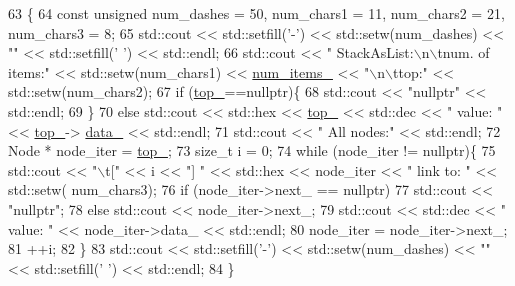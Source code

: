 \begin{DoxyCode}
63                                    \{
64         \textcolor{keyword}{const} \textcolor{keywordtype}{unsigned} num\_dashes = 50, num\_chars1 = 11, num\_chars2 = 21, num\_chars3 = 8;
65         std::cout << std::setfill(\textcolor{charliteral}{'-'}) << std::setw(num\_dashes) << \textcolor{stringliteral}{""} << std::setfill(\textcolor{charliteral}{' '}) << std::endl;
66         std::cout << \textcolor{stringliteral}{"   StackAsList:\(\backslash\)n\(\backslash\)tnum. of items:"} << std::setw(num\_chars1) << 
      \hyperlink{classstk_1_1_stack_as_list_a203bb8328f70a7e5b6eebbc29e71d011}{num\_items\_} << \textcolor{stringliteral}{"\(\backslash\)n\(\backslash\)ttop:"} << std::setw(num\_chars2);
67         \textcolor{keywordflow}{if} (\hyperlink{classstk_1_1_stack_as_list_afb5080650911a8b907dd5b383a153239}{top\_}==\textcolor{keyword}{nullptr})\{
68             std::cout << \textcolor{stringliteral}{"nullptr"} << std::endl;
69         \}
70         \textcolor{keywordflow}{else} std::cout << std::hex << \hyperlink{classstk_1_1_stack_as_list_afb5080650911a8b907dd5b383a153239}{top\_} << std::dec << \textcolor{stringliteral}{" value: "} << \hyperlink{classstk_1_1_stack_as_list_afb5080650911a8b907dd5b383a153239}{top\_}->
      \hyperlink{structstk_1_1_stack_as_list_1_1_node_a7a634b5814175d7bcdee465da07ca3d4}{data\_} << std::endl;
71         std::cout << \textcolor{stringliteral}{"    All nodes:"} << std::endl;
72         Node * node\_iter = \hyperlink{classstk_1_1_stack_as_list_afb5080650911a8b907dd5b383a153239}{top\_};
73         \textcolor{keywordtype}{size\_t} i = 0;
74         \textcolor{keywordflow}{while} (node\_iter != \textcolor{keyword}{nullptr})\{
75             std::cout << \textcolor{stringliteral}{"\(\backslash\)t["} << i << \textcolor{stringliteral}{"] "} << std::hex << node\_iter << \textcolor{stringliteral}{" link to: "} << std::setw(
      num\_chars3);
76             \textcolor{keywordflow}{if} (node\_iter->next\_ == \textcolor{keyword}{nullptr})
77                 std::cout << \textcolor{stringliteral}{"nullptr"};
78             \textcolor{keywordflow}{else} std::cout << node\_iter->next\_;
79             std::cout << std::dec << \textcolor{stringliteral}{" value: "} << node\_iter->data\_ << std::endl;
80             node\_iter = node\_iter->next\_;
81             ++i;
82         \}
83         std::cout << std::setfill(\textcolor{charliteral}{'-'}) << std::setw(num\_dashes) << \textcolor{stringliteral}{""} << std::setfill(\textcolor{charliteral}{' '}) << std::endl;
84     \}
\end{DoxyCode}
\hypertarget{classstk_1_1_stack_as_list_a56147e51e4a0c2fef70e6d40a7a0b63d}{}
